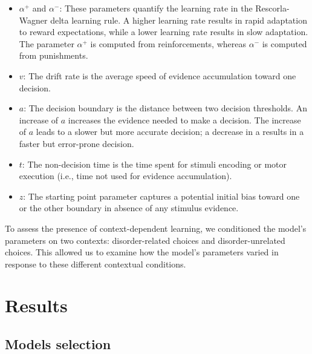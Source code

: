 \documentclass[
  man,floatsintext]{apa6}
\providecommand{\tightlist}{%
  \setlength{\itemsep}{0pt}\setlength{\parskip}{0pt}}
\begin{document}
\begin{itemize}
\tightlist
\item
  \(\alpha^+\) and \(\alpha^-\): These parameters quantify the learning rate in the Rescorla-Wagner delta learning rule. A higher learning rate results in rapid adaptation to reward expectations, while a lower learning rate results in slow adaptation. The parameter \(\alpha^+\) is computed from reinforcements, whereas \(\alpha^-\) is computed from punishments.
\item
  \(v\): The drift rate is the average speed of evidence accumulation toward one decision.
\item
  \(a\): The decision boundary is the distance between two decision thresholds. An increase of \(a\) increases the evidence needed to make a decision. The increase of \(a\) leads to a slower but more accurate decision; a decrease in a results in a faster but error-prone decision.
\item
  \(t\): The non-decision time is the time spent for stimuli encoding or motor execution (i.e., time not used for evidence accumulation).
\item
  \(z\): The starting point parameter captures a potential initial bias toward one or the other boundary in absence of any stimulus evidence.
\end{itemize}

To assess the presence of context-dependent learning, we conditioned the model's parameters on two contexts: disorder-related choices and disorder-unrelated choices. This allowed us to examine how the model's parameters varied in response to these different contextual conditions.

\hypertarget{results}{%
\section{Results}\label{results}}

\hypertarget{models-selection}{%
\subsection{Models selection}\label{models-selection}}
\end{document}
